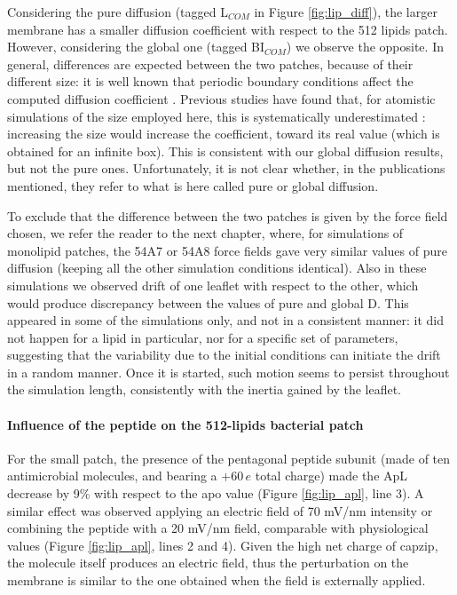 Considering the pure diffusion (tagged L$_{COM}$ in Figure \ref{fig:lip_diff}), the larger membrane has a smaller diffusion coefficient with respect to the 512 lipids patch. However, considering the global one (tagged BI$_{COM}$) we observe the opposite.
%
In general, differences are expected between the two patches, because of their different size: it is well known that periodic boundary conditions affect the computed diffusion coefficient \citep{Camley2015,Venable2017}. Previous studies have found that, for atomistic simulations of the size employed here, this is systematically underestimated \citep{Camley2015}: increasing the size would increase the coefficient, toward its real value (which is obtained for an infinite box). This is consistent with our global diffusion results, but not the pure ones. Unfortunately, it is not clear whether, in the publications mentioned, they refer to what is here called pure or global diffusion.

To exclude that the difference between the two patches is given by the force field chosen, we refer the reader to the next chapter, where, for simulations of monolipid patches, the 54A7 or 54A8 force fields gave very similar values of pure diffusion (keeping all the other simulation conditions identical).
%
Also in these simulations we observed drift of one leaflet with respect to the other, which would produce discrepancy between the values of pure and global D. This appeared in some of the simulations only, and not in a consistent manner: it did not happen for a lipid in particular, nor for a specific set of parameters, suggesting that the variability due to the initial conditions can initiate the drift in a random manner.
Once it is started, such motion seems to persist throughout the simulation length, consistently with the inertia gained by the leaflet.


\paragraph{Influence of the peptide on the 512-lipids bacterial patch}
For the small patch, the presence of the pentagonal peptide subunit (made of ten antimicrobial molecules, and bearing a $+60\,e$ total charge) made the ApL decrease by 9\% with respect to the apo value (Figure \ref{fig:lip_apl}, line 3).
%
A similar effect was observed applying an electric field of 70 mV/nm intensity or combining the peptide with a 20 mV/nm field, comparable with physiological values (Figure \ref{fig:lip_apl}, lines 2 and 4).
%
Given the high net charge of capzip, the molecule itself produces an electric field, thus the perturbation on the membrane is similar to the one obtained when the field is externally applied.

